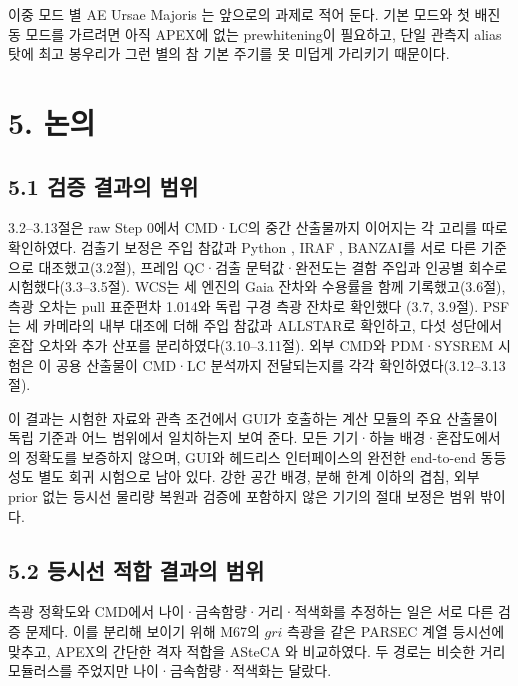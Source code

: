 이중 모드 별 AE Ursae Majoris \citep{zhou2001, paparo2001} 는 앞으로의 과제로 적어 둔다. 기본 모드와 첫 배진동 모드를 가르려면 아직 APEX에 없는 prewhitening이 필요하고, 단일 관측지 alias 탓에 최고 봉우리가 그런 별의 참 기본 주기를 못 미덥게 가리키기 때문이다.



\section{5. 논의}

\subsection{5.1 검증 결과의 범위}

3.2–3.13절은 raw Step 0에서 CMD·LC의 중간 산출물까지 이어지는 각 고리를 따로 확인하였다. 검출기 보정은 주입 참값과 Python \texttt{}, IRAF \texttt{}, BANZAI를 서로 다른 기준으로 대조했고(3.2절), 프레임 QC·검출 문턱값·완전도는 결함 주입과 인공별 회수로 시험했다(3.3–3.5절). WCS는 세 엔진의 Gaia 잔차와 수용률을 함께 기록했고(3.6절), 측광 오차는 pull 표준편차 1.014와 독립 구경 측광 잔차로 확인했다 (3.7, 3.9절). PSF는 세 카메라의 내부 대조에 더해 주입 참값과 ALLSTAR로 확인하고, 다섯 성단에서 혼잡 오차와 추가 산포를 분리하였다(3.10–3.11절). 외부 CMD와 PDM·SYSREM 시험은 이 공용 산출물이 CMD·LC 분석까지 전달되는지를 각각 확인하였다(3.12–3.13절).



이 결과는 시험한 자료와 관측 조건에서 GUI가 호출하는 계산 모듈의 주요 산출물이 독립 기준과 어느 범위에서 일치하는지 보여 준다. 모든 기기·하늘 배경·혼잡도에서의 정확도를 보증하지 않으며, GUI와 헤드리스 인터페이스의 완전한 end-to-end 동등성도 별도 회귀 시험으로 남아 있다. 강한 공간 배경, 분해 한계 이하의 겹침, 외부 prior 없는 등시선 물리량 복원과 검증에 포함하지 않은 기기의 절대 보정은 범위 밖이다.



\subsection{5.2 등시선 적합 결과의 범위}

측광 정확도와 CMD에서 나이·금속함량·거리·적색화를 추정하는 일은 서로 다른 검증 문제다. 이를 분리해 보이기 위해 M67의 $gri$ 측광을 같은 PARSEC 계열 등시선에 맞추고, APEX의 간단한 격자 적합을 ASteCA \citep{perren2015}와 비교하였다. 두 경로는 비슷한 거리 모듈러스를 주었지만 나이·금속함량·적색화는 달랐다.



